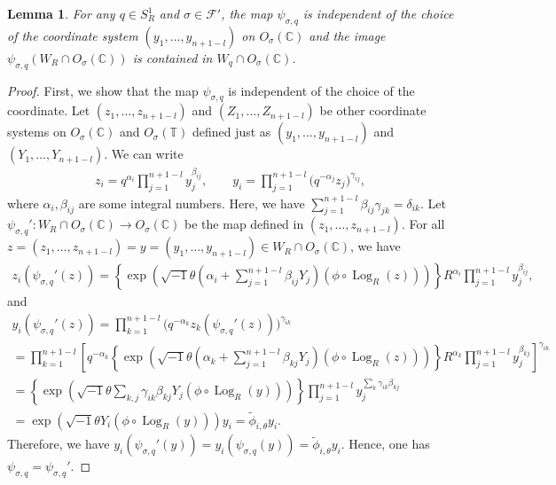 \documentclass[pdftex]{sigma}
\numberwithin{equation}{section}
\newtheorem{Lemma}[Theorem]{Lemma}
\begin{document}
\begin{Lemma}\label{lm:c0}
For any $q \in S_R^1$ and $\sigma \in {\mathcal F}'$, the map $\psi_{\sigma,q}$ is independent of the choice of the coordinate system $(y_1, \dots, y_{n+1-l})$ on $O_\sigma({\mathbb C})$ and the image $\psi_{\sigma,q}(W_R \cap O_\sigma({\mathbb C}))$ is contained in $W_q \cap O_\sigma({\mathbb C})$.
\end{Lemma}
\begin{proof}
First, we show that the map $\psi_{\sigma,q}$ is independent of the choice of the coordinate. Let $(z_1, \dots, z_{n+1-l})$ and $(Z_1, \dots, Z_{n+1-l})$ be other coordinate systems on $O_\sigma({\mathbb C})$ and $O_\sigma({\mathbb T})$ def\/ined just as $(y_1, \dots, y_{n+1-l})$ and $(Y_1, \dots, Y_{n+1-l})$.
We can write
\begin{gather*}
z_i=q^{\alpha_i}\prod_{j=1}^{n+1-l}y_j^{\beta_{ij}}, \qquad y_i=\prod_{j=1}^{n+1-l}\big(q^{-\alpha_j}z_j\big)^{\gamma_{ij}},
\end{gather*}
where $\alpha_i, \beta_{ij}$ are some integral numbers. Here, we have $\sum\limits_{j=1}^{n+1-l}\beta_{ij}\gamma_{jk}=\delta_{ik}$. Let $\psi_{\sigma,q}' \colon W_R \cap O_\sigma({\mathbb C}) \to O_\sigma({\mathbb C})$ be the map def\/ined in $(z_1, \dots, z_{n+1-l})$. For all $z=(z_1, \dots, z_{n+1-l})=y=(y_1, \dots, y_{n+1-l}) \in W_R \cap O_\sigma({\mathbb C})$, we have
\begin{gather*}
z_i \left( \psi_{\sigma,q}' (z) \right)= \left\{ \exp \left( \sqrt{-1} \theta \left( \alpha_i+\sum_{j=1}^{n+1-l} \beta_{ij} Y_j \right) \left( \phi \circ \operatorname{Log}_R (z)\right) \right) \right\} R^{\alpha_i} \prod_{j=1}^{n+1-l} y_j^{\beta_{ij}},
\end{gather*}
and
\begin{gather*}
y_i \left( \psi_{\sigma,q}'(z) \right) =\prod_{k=1}^{n+1-l} \big( q^{-\alpha_k} z_k (\psi_{\sigma,q}' (z)) \big)^{\gamma_{ik}} \\
 =\prod_{k=1}^{n+1-l} \left[ q^{-\alpha_k} \left\{ \exp \left( \sqrt{-1} \theta \left( \alpha_k+\sum_{j=1}^{n+1-l} \beta_{kj} Y_j \right) \left( \phi \circ \operatorname{Log}_R (z)\right) \right) \right\} R^{\alpha_k} \prod_{j=1}^{n+1-l} y_j^{\beta_{kj}} \right]^{\gamma_{ik}} \\
 =\left\{ \exp \left(\sqrt{-1} \theta \sum_{k,j} \gamma_{ik} \beta_{kj} Y_j \left(\phi \circ \operatorname{Log}_R (y) \right) \right) \right\} \prod_{j=1}^{n+1-l} y_j^{\sum_{k} \gamma_{ik} \beta_{kj}} \\
 =\exp \left( \sqrt{-1} \theta Y_i \left( \phi \circ \operatorname{Log}_R (y) \right) \right) y_i = \tilde{\phi}_{i,\theta} y_i.
\end{gather*}
Therefore, we have $y_i ( \psi_{\sigma,q}'(y) )=y_i (\psi_{\sigma,q}(y) )=\tilde{\phi}_{i,\theta} y_i$. Hence, one has $\psi_{\sigma,q} = \psi_{\sigma,q}'$.


\end{proof}
\end{document}
